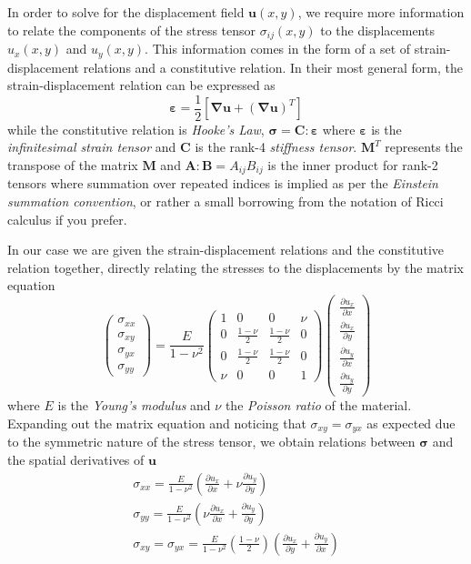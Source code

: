 \documentclass[11pt]{article}
\newcommand\p[2]{\frac{\partial #1}{\partial #2}}
\begin{document}
In order to solve for the displacement field $\bm{u}(x,y)$, we require more information to relate the components of the stress tensor $\sigma_{ij}(x,y)$ to the displacements $u_x(x,y)$ and $u_y(x,y)$. This information comes in the form of a set of strain-displacement relations and a constitutive relation. In their most general form, the strain-displacement relation can be expressed as
\begin{equation*}
  \bm{\varepsilon} =\frac{1}{2} \left[ \bm{\nabla u} + (\bm{\nabla u})^T \right]
\end{equation*}
while the constitutive relation is \emph{Hooke's Law}, $\bm{\sigma} = \bm{C : \varepsilon}$ where $\bm{\varepsilon}$ is the \emph{infinitesimal strain tensor} and $\bm{C}$ is the rank-4 \emph{stiffness tensor}. $\bm{M}^T$ represents the transpose of the matrix $\bm{M}$ and $\bm{A:B} = A_{ij}B_{ij}$ is the inner product for rank-2 tensors where summation over repeated indices is implied as per the \emph{Einstein summation convention}, or rather a small borrowing from the notation of Ricci calculus if you prefer.

In our case we are given the strain-displacement relations and the constitutive relation together, directly relating the stresses to the displacements by the matrix equation
\begin{equation}
\begin{pmatrix}
  \sigma_{xx} \\
  \sigma_{xy} \\
  \sigma_{yx} \\
  \sigma_{yy}
\end{pmatrix}
=
\frac{E}{1-\nu^2}
\begin{pmatrix}
  1 & 0 & 0 & \nu \\
  0 & \frac{1-\nu}{2} & \frac{1-\nu}{2} & 0 \\
  0 & \frac{1-\nu}{2} & \frac{1-\nu}{2} & 0 \\
  \nu & 0 & 0 & 1
\end{pmatrix}
\begin{pmatrix}
\p{u_x}{x} \\
\p{u_x}{y} \\
\p{u_y}{x} \\
\p{u_y}{y}
\end{pmatrix}
\end{equation}
where $E$ is the \emph{Young's modulus} and $\nu$ the \emph{Poisson ratio} of the material. Expanding out the matrix equation and noticing that $\sigma_{xy} = \sigma_{yx}$ as expected due to the symmetric nature of the stress tensor, we obtain relations between $\bm{\sigma}$ and the spatial derivatives of $\bm{u}$
\begin{equation} \label{eq:sigmaComp}
\begin{gathered}
  \sigma_{xx} = \frac{E}{1-\nu^2} \left( \p{u_x}{x} + \nu\p{u_y}{y} \right) \\
  \sigma_{yy} = \frac{E}{1-\nu^2} \left( \nu\p{u_x}{x} + \p{u_y}{y} \right) \\
  \sigma_{xy} = \sigma_{yx} = \frac{E}{1-\nu^2} \left( \frac{1-\nu}{2} \right) \left(\p{u_x}{y} + \p{u_y}{x} \right)
\end{gathered}
\end{equation}
\end{document}
